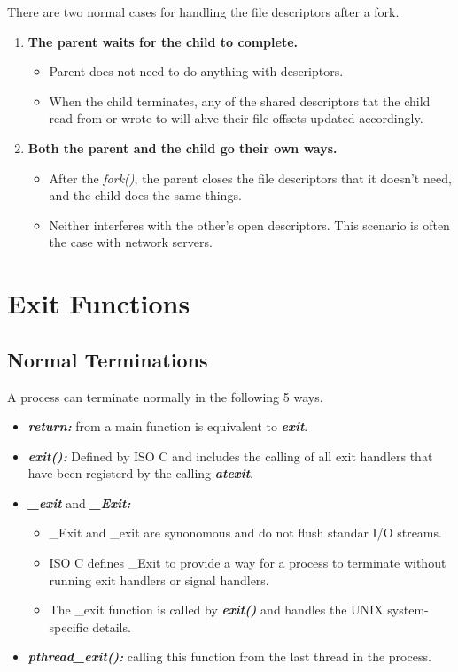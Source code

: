 \documentclass{article}
\newcommand\be[1]{\textbf{\emph{#1}}}
\begin{document}
There are two normal cases for handling the file descriptors
after a fork.
\begin{enumerate}
    \item \textbf{The parent waits for the child to complete.}
        \begin{itemize}
            \item Parent does not need to do anything with descriptors.
            \item When the child terminates, any of the shared 
                descriptors tat the child read from or wrote 
                to will ahve their file offsets updated 
                accordingly.
        \end{itemize}
    \item \textbf{Both the parent and the child go their own ways.}
        \begin{itemize}
            \item After the \emph{fork()}, the parent closes the file
                descriptors that it doesn't need, and the child does
                the same things.
            \item Neither interferes with the other's open descriptors.
                This scenario is often the case with network servers.
        \end{itemize}
\end{enumerate}

\section{Exit Functions}
\subsection{Normal Terminations}
A process can terminate normally in the following 5 ways.
\begin{itemize}
    \item \be{return:} from a main function is equivalent to \be{exit}.
    \item \be{exit():} Defined by ISO C and includes the calling of all 
        exit handlers that have been registerd by the calling \be{atexit}.
    \item \be{\_exit} and \be{\_Exit:} 
        \begin{itemize}
            \item \_Exit and \_exit are synonomous and do not flush standar I/O streams.
            \item ISO C defines \_Exit to provide a way for a process to 
                terminate without running exit handlers or signal handlers.
            \item The \_exit function is called by \be{exit()} and handles the UNIX 
                system-specific details.
        \end{itemize}
    \item \be{pthread\_exit():} calling this function from the last thread in the process.
\end{itemize}
\end{document}
